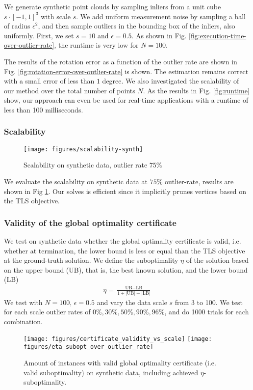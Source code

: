 We generate synthetic point clouds by sampling inliers from a unit cube $s \cdot [-1, 1]^3$ with scale $s$. We add uniform measurement noise by sampling a ball of radius $\epsilon^2$, and then sample outliers in the bounding box of the inliers, also uniformly. First, we set $s=10$ and $\epsilon=0.5$. As shown in Fig. \ref{fig:execution-time-over-outlier-rate}, the runtime is very low for $N =100$.

The results of the rotation error as a function of the outlier rate are shown in Fig. \ref{fig:rotation-error-over-outlier-rate} is shown. The estimation remains correct with a small error of less than $1$ degree. We also investigated the scalability of our method over the total number of points $N$. As the results in Fig. \ref{fig:runtime} show, our approach can even be used for real-time applications with a runtime of less than 100 milliseconds.

\subsubsection{Scalability}
\begin{figure}[!ht]
	\centering
	\texttt{[image: figures/scalability-synth]}
	\caption{Scalability on synthetic data, outlier rate $75\%$}
	\label{fig:execution-time-over-n}
\end{figure}

We evaluate the scalability on synthetic data at $75\%$ outlier-rate, results are shown in Fig \ref{fig:execution-time-over-n}. Our solves is efficient since it implicitly prunes vertices based on the TLS objective.

\subsubsection{Validity of the global optimality certificate}

We test on synthetic data whether the global optimality certificate is valid, i.e. whether at termination, the lower bound is less or equal than the TLS objective at the ground-truth solution.
We define the suboptimality $\eta$ of the solution based on the upper bound (UB), that is, the best known solution, and the lower bound (LB) \cite{9785843}
\begin{equation}
	\begin{aligned}    
		\eta = \frac{\text{UB} - \text{LB}}{1 + |\text{UB}| + |\text{LB}|}
	\end{aligned}
\end{equation}
We test with $N=100$, $\epsilon=0.5$ and vary the data scale $s$ from 3 to 100. We test for each scale outlier rates of $0\%, 30\%, 50\%, 90\%, 96\%$, and do 1000 trials for each combination.
\begin{figure}[!ht]
	\centering
	\texttt{[image: figures/certificate\_validity\_vs\_scale]}
	\texttt{[image: figures/eta\_subopt\_over\_outlier\_rate]}
	\caption{Amount of instances with valid global optimality certificate (i.e. valid suboptimality) on synthetic data, including achieved $\eta$-suboptimality.}
	\label{fig:cert-validity}
\end{figure}

